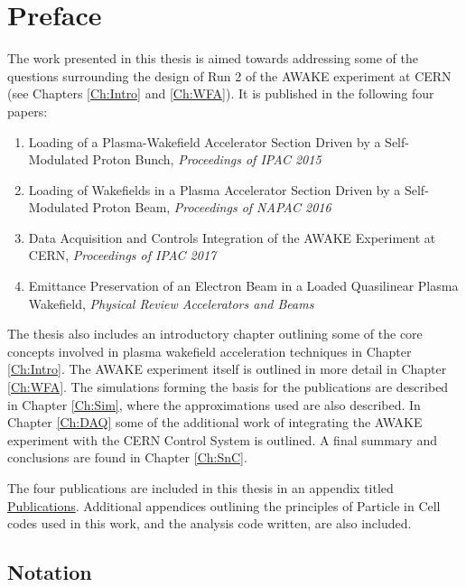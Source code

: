 \chapter*{Preface}

The work presented in this thesis is aimed towards addressing some of the questions surrounding the design of Run 2 of the AWAKE experiment at CERN (see Chapters \ref{Ch:Intro} and \ref{Ch:WFA}). It is published in the following four papers:

\begin{enumerate}[I]
    \item Loading of a Plasma-Wakefield Accelerator Section Driven by a Self-Modulated Proton Bunch, \emph{Proceedings of IPAC 2015} \cite{berglyd_olsen:2015}
    \item Loading of Wakefields in a Plasma Accelerator Section Driven by a Self-Modulated Proton Beam, \emph{Proceedings of NAPAC 2016} \cite{berglyd_olsen:2016}
    \item Data Acquisition and Controls Integration of the AWAKE Experiment at CERN, \emph{Proceedings of IPAC 2017} \cite{berglyd_olsen:2017}
    \item Emittance Preservation of an Electron Beam in a Loaded Quasilinear Plasma Wakefield, \emph{Physical Review Accelerators and Beams} \cite{berglyd_olsen:2018}
\end{enumerate}

The thesis also includes an introductory chapter outlining some of the core concepts involved in plasma wakefield acceleration techniques in Chapter \ref{Ch:Intro}. The AWAKE experiment itself is outlined in more detail in Chapter \ref{Ch:WFA}. The simulations forming the basis for the publications are described in Chapter \ref{Ch:Sim}, where the approximations used are also described. In Chapter \ref{Ch:DAQ} some of the additional work of integrating the AWAKE experiment with the CERN Control System is outlined. A final summary and conclusions are found in Chapter \ref{Ch:SnC}.

\noindent The four publications are included in this thesis in an appendix titled \hyperref[A:Pub]{Publications}. Additional appendices outlining the principles of Particle in Cell codes used in this work, and the analysis code written, are also included.

\newpage
\section*{Notation}

